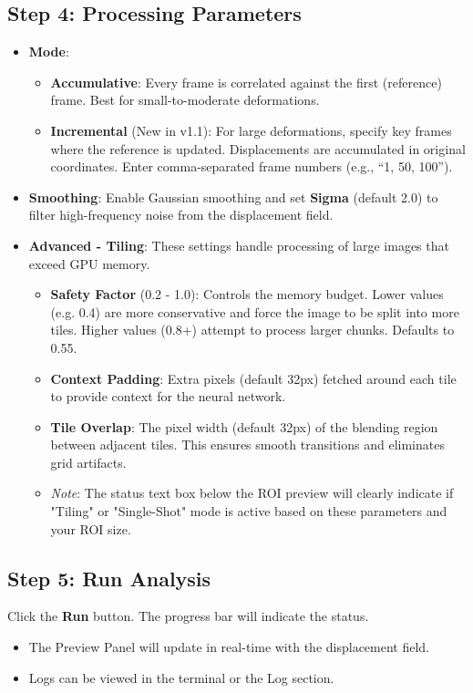 \documentclass[a4paper,12pt]{article}
\begin{document}
\subsection{Step 4: Processing Parameters}
\begin{itemize}
    \item \textbf{Mode}:
    \begin{itemize}
        \item \textbf{Accumulative}: Every frame is correlated against the first (reference) frame. Best for small-to-moderate deformations.
        \item \textbf{Incremental} (New in v1.1): For large deformations, specify key frames where the reference is updated. Displacements are accumulated in original coordinates. Enter comma-separated frame numbers (e.g., ``1, 50, 100'').
    \end{itemize}
    \item \textbf{Smoothing}: Enable Gaussian smoothing and set \textbf{Sigma} (default 2.0) to filter high-frequency noise from the displacement field.
    \item \textbf{Advanced - Tiling}: These settings handle processing of large images that exceed GPU memory.
    \begin{itemize}
        \item \textbf{Safety Factor} (0.2 - 1.0): Controls the memory budget. Lower values (e.g. 0.4) are more conservative and force the image to be split into more tiles. Higher values (0.8+) attempt to process larger chunks. Defaults to 0.55.
        \item \textbf{Context Padding}: Extra pixels (default 32px) fetched around each tile to provide context for the neural network.
        \item \textbf{Tile Overlap}: The pixel width (default 32px) of the blending region between adjacent tiles. This ensures smooth transitions and eliminates grid artifacts.
        \item \textit{Note}: The status text box below the ROI preview will clearly indicate if "Tiling" or "Single-Shot" mode is active based on these parameters and your ROI size.
    \end{itemize}
\end{itemize}

\subsection{Step 5: Run Analysis}
Click the \textbf{Run} button. The progress bar will indicate the status.
\begin{itemize}
    \item The Preview Panel will update in real-time with the displacement field.
    \item Logs can be viewed in the terminal or the Log section.
\end{itemize}
\end{document}
